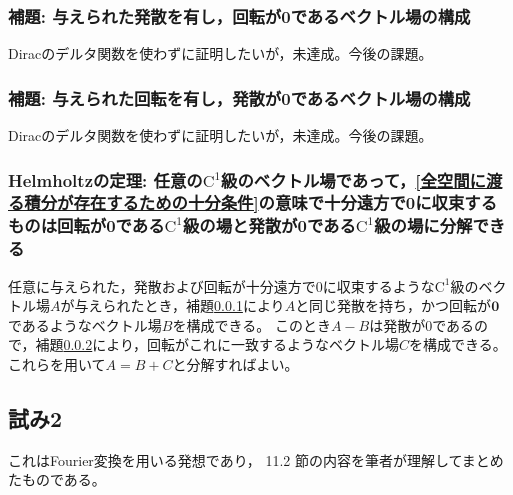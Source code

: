             \subsubsection{補題: 与えられた発散を有し，回転が\texorpdfstring{$\bm{0}$}{0}であるベクトル場の構成}
                \label{与えられた発散を有し，回転が無いベクトル場の構成}
                Diracのデルタ関数を使わずに証明したいが，未達成。今後の課題。
            \subsubsection{補題: 与えられた回転を有し，発散が0であるベクトル場の構成}
                \label{与えられた回転を有し，発散が無いベクトル場の構成}
                Diracのデルタ関数を使わずに証明したいが，未達成。今後の課題。
            \subsubsection{Helmholtzの定理: 任意の\texorpdfstring{$\mathrm{C}^1$}{C\string^1}級のベクトル場であって，\ref{全空間に渡る積分が存在するための十分条件}の意味で十分遠方で0に収束するものは回転が\texorpdfstring{$\bm{0}$}{0}である\texorpdfstring{$\mathrm{C}^1$}{C\string^1}級の場と発散が0である\texorpdfstring{$\mathrm{C}^1$}{C\string^1}級の場に分解できる}
                任意に与えられた，発散および回転が十分遠方で0に収束するような$\mathrm{C}^1$級のベクトル場$A$が与えられたとき，補題\ref{与えられた発散を有し，回転が無いベクトル場の構成}により$A$と同じ発散を持ち，かつ回転が$\bm{0}$であるようなベクトル場$B$を構成できる。
                このとき$A - B$は発散が0であるので，補題\ref{与えられた回転を有し，発散が無いベクトル場の構成}により，回転がこれに一致するようなベクトル場$C$を構成できる。
                これらを用いて$A = B + C$と分解すればよい。
        \subsection{試み2}
            これはFourier変換を用いる発想であり，\cite{qm3_chap5_j} 11.2 節の内容を筆者が理解してまとめたものである。
